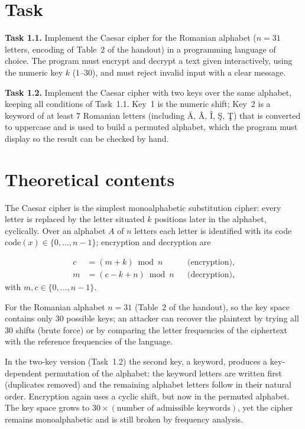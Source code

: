 \documentclass[12pt,a4paper]{article}
\begin{document}
\section{Task}

\textbf{Task 1.1.} Implement the Caesar cipher for the Romanian alphabet ($n=31$ letters, encoding of Table~2 of the handout) in a programming language of choice. The program must encrypt and decrypt a text given interactively, using the numeric key $k$ ($1$--$30$), and must reject invalid input with a clear message.

\textbf{Task 1.2.} Implement the Caesar cipher with two keys over the same alphabet, keeping all conditions of Task~1.1. Key~1 is the numeric shift; Key~2 is a keyword of at least 7 Romanian letters (including \u{A}, \^{A}, \^{I}, \c{S}, \c{T}) that is converted to uppercase and is used to build a permuted alphabet, which the program must display so the result can be checked by hand.

\section{Theoretical contents}

The Caesar cipher is the simplest monoalphabetic substitution cipher: every letter is replaced by the letter situated $k$ positions later in the alphabet, cyclically. Over an alphabet $A$ of $n$ letters each letter is identified with its code $\mathrm{code}(x)\in\{0,\ldots,n-1\}$; encryption and decryption are

\begin{align*}
  c &= (m+k) \bmod n && \text{(encryption)},\\
  m &= (c-k+n) \bmod n && \text{(decryption)},
\end{align*}
with $m,c\in\{0,\ldots,n-1\}$.

For the Romanian alphabet $n=31$ (Table~2 of the handout), so the key space contains only 30 possible keys; an attacker can recover the plaintext by trying all 30 shifts (brute force) or by comparing the letter frequencies of the ciphertext with the reference frequencies of the language.

In the two-key version (Task~1.2) the second key, a keyword, produces a key-dependent permutation of the alphabet: the keyword letters are written first (duplicates removed) and the remaining alphabet letters follow in their natural order. Encryption again uses a cyclic shift, but now in the permuted alphabet. The key space grows to $30\times(\text{number of admissible keywords})$, yet the cipher remains monoalphabetic and is still broken by frequency analysis.
\end{document}
